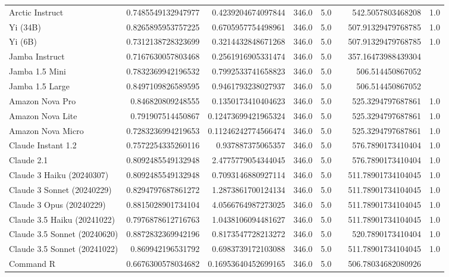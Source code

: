 \begin{table}[htp]
{\begin{tabular}{lrrrrrrr}
Arctic Instruct & 0.7485549132947977 & 0.4239204674097844 & 346.0 & 5.0 &  & 542.5057803468208 & 1.0 \\
Yi (34B) & 0.8265895953757225 & 0.6705957754498961 & 346.0 & 5.0 &  & 507.91329479768785 & 1.0 \\
Yi (6B) & 0.7312138728323699 & 0.3214432848671268 & 346.0 & 5.0 &  & 507.91329479768785 & 1.0 \\
Jamba Instruct & 0.7167630057803468 & 0.2561916905331474 & 346.0 & 5.0 &  & 357.16473988439304 &  \\
Jamba 1.5 Mini & 0.7832369942196532 & 0.7992533741658823 & 346.0 & 5.0 &  & 506.514450867052 &  \\
Jamba 1.5 Large & 0.8497109826589595 & 0.9461793238027937 & 346.0 & 5.0 &  & 506.514450867052 &  \\
Amazon Nova Pro & 0.846820809248555 & 0.1350173410404623 & 346.0 & 5.0 &  & 525.3294797687861 & 1.0 \\
Amazon Nova Lite & 0.791907514450867 & 0.12473699421965324 & 346.0 & 5.0 &  & 525.3294797687861 & 1.0 \\
Amazon Nova Micro & 0.7283236994219653 & 0.11246242774566474 & 346.0 & 5.0 &  & 525.3294797687861 & 1.0 \\
Claude Instant 1.2 & 0.7572254335260116 & 0.937887375065357 & 346.0 & 5.0 &  & 576.7890173410404 & 1.0 \\
Claude 2.1 & 0.8092485549132948 & 2.4775779054344045 & 346.0 & 5.0 &  & 576.7890173410404 & 1.0 \\
Claude 3 Haiku (20240307) & 0.8092485549132948 & 0.7093146880927114 & 346.0 & 5.0 &  & 511.78901734104045 & 1.0 \\
Claude 3 Sonnet (20240229) & 0.8294797687861272 & 1.2873861700124134 & 346.0 & 5.0 &  & 511.78901734104045 & 1.0 \\
Claude 3 Opus (20240229) & 0.8815028901734104 & 4.0566764987273025 & 346.0 & 5.0 &  & 511.78901734104045 & 1.0 \\
Claude 3.5 Haiku (20241022) & 0.7976878612716763 & 1.0438106094481627 & 346.0 & 5.0 &  & 511.78901734104045 & 1.0 \\
Claude 3.5 Sonnet (20240620) & 0.8872832369942196 & 0.8173547728213272 & 346.0 & 5.0 &  & 520.7890173410404 & 1.0 \\
Claude 3.5 Sonnet (20241022) & 0.869942196531792 & 0.6983739172103088 & 346.0 & 5.0 &  & 511.78901734104045 & 1.0 \\
Command R & 0.6676300578034682 & 0.16953640452699165 & 346.0 & 5.0 &  & 506.78034682080926 &  \\

\end{tabular}}
\end{table}
